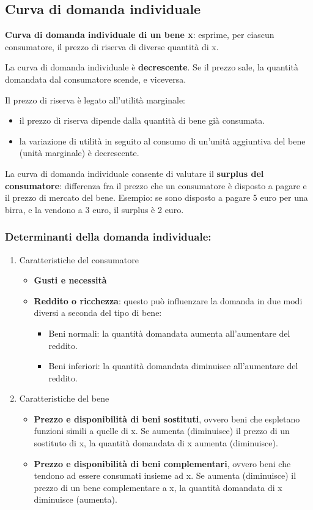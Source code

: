 \documentclass[../main.tex]{subfiles}
\begin{document}
\subsection{Curva di domanda individuale}

\textbf{Curva di domanda individuale di un bene x}: esprime, per ciascun consumatore, il prezzo di riserva di diverse quantità di x.

La curva di domanda individuale è \textbf{decrescente}. Se il prezzo sale, la quantità domandata dal consumatore scende, e viceversa.

Il prezzo di riserva è legato all'utilità marginale:
\begin{itemize}
	\item  il prezzo di riserva dipende dalla quantità di bene già consumata.
	\item la variazione di utilità in seguito al consumo di un'unità aggiuntiva del bene (unità marginale) è decrescente.
\end{itemize}

La curva di domanda individuale consente di valutare il \textbf{surplus del consumatore}: differenza fra il prezzo che un consumatore è disposto a pagare e il prezzo di mercato del bene. Esempio: se sono disposto a pagare 5 euro per una birra, e la vendono a 3 euro, il surplus è 2 euro.

\subsubsection{Determinanti della domanda individuale:}
\begin{enumerate}
	\item Caratteristiche del consumatore
	      \begin{itemize}
		      \item \textbf{Gusti e necessità}
		      \item \textbf{Reddito o ricchezza}: questo può influenzare la domanda in due modi diversi a seconda del tipo di bene:
		            \begin{itemize}
			            \item Beni normali: la quantità domandata aumenta all'aumentare del reddito.
			            \item Beni inferiori: la quantità domandata diminuisce all'aumentare del reddito.
		            \end{itemize}
	      \end{itemize}
	\item Caratteristiche del bene
	      \begin{itemize}
		      \item \textbf{Prezzo e disponibilità di beni sostituti}, ovvero beni che espletano funzioni simili a quelle di x. Se aumenta (diminuisce) il prezzo di un sostituto di x, la quantità domandata di x aumenta (diminuisce).
		      \item \textbf{Prezzo e disponibilità di beni complementari}, ovvero beni che tendono ad essere consumati insieme ad x. Se aumenta (diminuisce) il prezzo di un bene complementare a x, la quantità domandata di x diminuisce (aumenta).
	      \end{itemize}
\end{enumerate}
\end{document}
